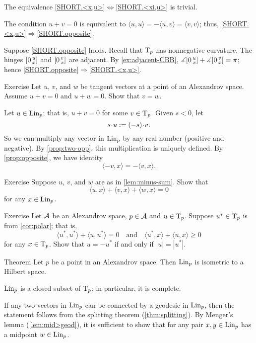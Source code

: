 The equivalence  \ref{SHORT.<x,u>}$\Leftrightarrow$\ref{SHORT.<xi,u>} is trivial.

The condition $u+v=0$ is equivalent to 
$\langle u,u\rangle =-\langle u,v\rangle =\langle v,v\rangle$;
thus,
\ref{SHORT.<x,u>}$\Rightarrow$\ref{SHORT.opposite}.

Suppose  \ref{SHORT.opposite} holds.
Recall that $\mathrm{T}_p$ has nonnegative curvature.
The hinges $[0\,{}^{u}_{x}]$ and $[0\,{}^{v}_{x}]$ are adjacent.
By \ref{ex:adjacent-CBB}, $\measuredangle[0\,{}^{u}_{x}]+\measuredangle[0\,{}^{v}_{x}]=\pi$;
hence \ref{SHORT.opposite}$\Rightarrow$\ref{SHORT.<x,u>}.
\qeds

\begin{thm}{Exercise}\label{prop:two-opp}
Let $u$, $v$, and $w$ be tangent vectors at a point of an Alexandrov space.
Assume $u+v=0$ and $u+ w=0$.
Show that $v=w$.
\end{thm}

Let $u\in \mathop{\rm Lin}\nolimits_p$; that is, $u+v=0$ for some $v\in\mathrm{T}_p$.
Given $s<0$, let 
\[s\cdot u\df (-s)\cdot v.\]
So we can multiply any vector in $\mathop{\rm Lin}\nolimits_p$ by any real number (positive and negative).
By \ref{prop:two-opp}, this multiplication is uniquely defined.
By \ref{prop:opposite}, we have identity
\[\langle -v,x\rangle=-\langle v,x\rangle.\]


\begin{thm}{Exercise}\label{ex:3<,>=0}
Suppose $u$, $v$, and $w$ are as in \ref{lem:minus-sum}.
Show that
\[\langle u,x\rangle +\langle v,x\rangle +\langle w,x\rangle = 0\]
for any $x\in \mathop{\rm Lin}\nolimits_p$.
\end{thm}

\begin{thm}{Exercise}\label{ex:-u}
Let $\mathcal{A}$ be an Alexandrov space,
$p\in \mathcal{A}$ and $u\in \mathrm{T}_p$.
Suppose $u^*\in \mathrm{T}_p$ is from \ref{cor:polar};
that is, 
\[\langle u^*,u^*\rangle +\langle u,u^*\rangle = 0
\quad\text{and}\quad
\langle u^*,x\rangle +\langle u,x\rangle \ge 0
\]
for any $x\in \mathrm{T}_p$.
Show that $u=-u^*$ if and only if $|u|=|u^*|$.
\end{thm}

\begin{thm}{Theorem}\label{thm:lin-subcone}
Let $p$ be a point in an Alexandrov space. 
Then $\mathop{\rm Lin}\nolimits_p$ is isometric to a Hilbert space.
\end{thm}

$\mathop{\rm Lin}\nolimits_p$ is a closed subset of $\mathrm{T}_p$;
in particular, it is complete.

If any two vectors in $\mathop{\rm Lin}\nolimits_p$ can be connected by a geodesic in $\mathop{\rm Lin}\nolimits_p$,
then the statement follows from the splitting theorem (\ref{thm:splitting}).
By Menger's lemma (\ref{lem:mid>geod}), it is sufficient to show that for any pair $x,y\in\mathop{\rm Lin}\nolimits_p$
has a midpoint $w\in \mathop{\rm Lin}\nolimits_p$.

